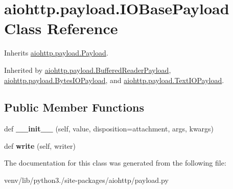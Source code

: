 \hypertarget{classaiohttp_1_1payload_1_1_i_o_base_payload}{}\section{aiohttp.\+payload.\+I\+O\+Base\+Payload Class Reference}
\label{classaiohttp_1_1payload_1_1_i_o_base_payload}


Inherits \hyperlink{classaiohttp_1_1payload_1_1_payload}{aiohttp.\+payload.\+Payload}.



Inherited by \hyperlink{classaiohttp_1_1payload_1_1_buffered_reader_payload}{aiohttp.\+payload.\+Buffered\+Reader\+Payload}, \hyperlink{classaiohttp_1_1payload_1_1_bytes_i_o_payload}{aiohttp.\+payload.\+Bytes\+I\+O\+Payload}, and \hyperlink{classaiohttp_1_1payload_1_1_text_i_o_payload}{aiohttp.\+payload.\+Text\+I\+O\+Payload}.

\subsection*{Public Member Functions}
\begin{DoxyCompactItemize}
\item 
\mbox{\label{classaiohttp_1_1payload_1_1_i_o_base_payload_aa5274466a6d4b2659c4ca691f0fbbc8e}} 
def {\bfseries \+\_\+\+\_\+init\+\_\+\+\_\+} (self, value, disposition=\textquotesingle{}attachment\textquotesingle{}, args, kwargs)
\item 
\mbox{\label{classaiohttp_1_1payload_1_1_i_o_base_payload_ae00ac8c9cfca739de6e75f7176b49467}} 
def {\bfseries write} (self, writer)
\end{DoxyCompactItemize}


The documentation for this class was generated from the following file\+:\begin{DoxyCompactItemize}
\item 
venv/lib/python3./site-\/packages/aiohttp/payload.\+py\end{DoxyCompactItemize}
